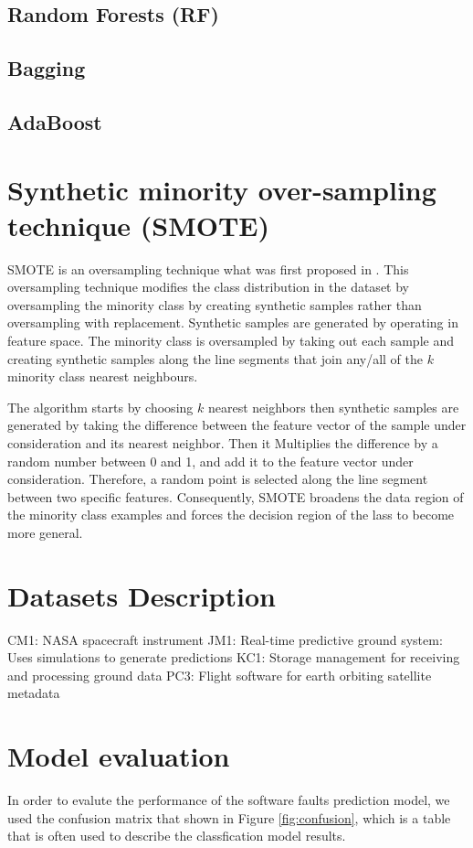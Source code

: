 \documentclass[runningheads,a4paper]{llncs}
\begin{document}
\subsection{Random Forests (RF)}
\subsection{Bagging}
\subsection{AdaBoost}

\section{Synthetic minority over-sampling technique (SMOTE)}

SMOTE is an oversampling technique what was first proposed in \cite{chawla2002smote}. This oversampling technique modifies the class distribution in the dataset by oversampling the minority class by creating synthetic samples rather than oversampling with replacement. Synthetic samples are generated by operating in feature space.
The minority class is oversampled by taking out each sample and creating synthetic samples along the line segments that join any/all of the $k$ minority class nearest neighbours. 

The algorithm starts by choosing $k$ nearest neighbors then synthetic samples
are generated by taking the difference between the feature vector of the sample
under consideration and its nearest neighbor. Then it Multiplies the difference by a random number between 0 and 1, and add it to the feature vector under consideration. Therefore, a random point is selected along the line segment between two specific features. Consequently, SMOTE broadens the data region of the minority class examples and forces the decision region of the lass to become more general.



\section{Datasets Description}
\label{data}

CM1: NASA spacecraft instrument
JM1: Real-time predictive ground system: Uses simulations to generate predictions
KC1: Storage management for receiving and processing ground
data
PC3: Flight software for earth orbiting satellite metadata


\section{Model evaluation}
\label{evaluation_criteria}
In order to evalute the performance of the software faults prediction model, we used the confusion matrix that shown in Figure \ref{fig:confusion}, which is a table that is often used to describe the classfication model results. 
\end{document}
